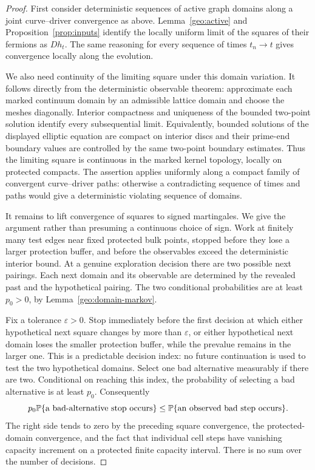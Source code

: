 \begin{proof}
First consider deterministic sequences of active graph domains along
a joint curve--driver convergence as above. Lemma~\ref{geo:active}
and Proposition~\ref{prop:inputs} identify the locally uniform limit
of the squares of their fermions as \(D h_t\). The same reasoning
for every sequence of times \(t_n\to t\) gives convergence locally
along the evolution.

We also need continuity of the limiting square under this domain
variation. It follows directly from the deterministic observable
theorem: approximate each marked continuum domain by an admissible
lattice domain and choose the meshes diagonally. Interior compactness
and uniqueness of the bounded two-point solution identify every
subsequential limit. Equivalently, bounded solutions of the displayed
elliptic equation are compact on interior discs and their prime-end
boundary values are controlled by the same two-point boundary
estimates. Thus the limiting square is continuous in the marked
kernel topology, locally on protected compacts. The assertion applies
uniformly along a compact family of convergent curve--driver paths:
otherwise a contradicting sequence of times and paths would give a
deterministic violating sequence of domains.

It remains to lift convergence of squares to signed martingales.
We give the argument rather than presuming a continuous choice of
sign. Work at finitely many test edges near fixed protected bulk
points, stopped before they lose a larger protection buffer, and
before the observables exceed the deterministic interior bound.
At a genuine exploration decision there are two possible next
pairings. Each next domain and its observable are determined by the
revealed past and the hypothetical pairing. The two conditional
probabilities are at least \(p_0>0\), by
Lemma~\ref{geo:domain-markov}.

Fix a tolerance \(\varepsilon>0\). Stop immediately before the first
decision at which either hypothetical next square changes by more
than \(\varepsilon\), or either hypothetical next domain loses the
smaller protection buffer, while the prevalue remains in the larger
one. This is a predictable decision index: no future continuation
is used to test the two hypothetical domains. Select one bad
alternative measurably if there are two. Conditional on reaching
this index, the probability of selecting a bad alternative is at
least \(p_0\). Consequently
\begin{equation}
 p_0\mathbb P\{\text{a bad-alternative stop occurs}\}
 \le
 \mathbb P\{\text{an observed bad step occurs}\}.
 \label{geo:bad-alternative}
\end{equation}
The right side tends to zero by the preceding square convergence,
the protected-domain convergence, and the fact that individual
cell steps have vanishing capacity increment on a protected finite
capacity interval. There is no sum over the number of decisions.


\end{proof}
